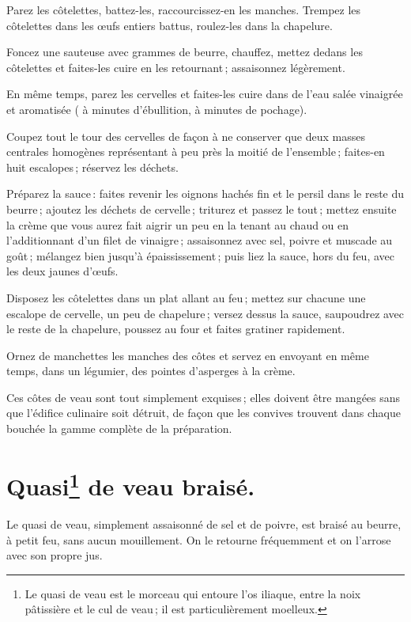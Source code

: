 Parez les côtelettes, battez-les, raccourcissez-en les manches. Trempez les
côtelettes dans les œufs entiers battus, roulez-les dans la chapelure.

Foncez une sauteuse avec {\mmm} grammes de beurre, chauffez, mettez dedans les
côtelettes et faites-les cuire en les retournant ; assaisonnez légèrement.

En même temps, parez les cervelles et faites-les cuire dans de l'eau salée
vinaigrée et aromatisée ({\mmm} à {\mmm} minutes d'ébullition, {\mmm} à {\mmm} minutes de pochage).

Coupez tout le tour des cervelles de façon à ne conserver que deux masses
centrales homogènes représentant à peu près la moitié de l'ensemble ; faites-en
huit escalopes ; réservez les déchets.

Préparez la sauce : faites revenir les oignons hachés fin et le persil dans le
reste du beurre ; ajoutez les déchets de cervelle ; triturez et passez le
tout ; mettez ensuite la crème que vous aurez fait aigrir un peu en la tenant
au chaud ou en l'additionnant d'un filet de vinaigre ; assaisonnez avec sel,
poivre et muscade au goût ; mélangez bien jusqu'à épaississement ; puis liez la
sauce, hors du feu, avec les deux jaunes d'œufs.

Disposez les côtelettes dans un plat allant au feu ; mettez sur chacune une
escalope de cervelle, un peu de chapelure ; versez dessus la sauce, saupoudrez
avec le reste de la chapelure, poussez au four et faites gratiner rapidement.

Ornez de manchettes les manches des côtes et servez en envoyant en même
temps, dans un légumier, des pointes d'asperges à la crème.

Ces côtes de veau sont tout simplement exquises ; elles doivent être mangées
sans que l'édifice culinaire soit détruit, de façon que les convives trouvent
dans chaque bouchée la gamme complète de la préparation.

\section*{\centering Quasi\footnote{Le quasi de veau est le morceau qui entoure
l'os iliaque, entre la noix pâtissière et le cul de veau ; il est
particulièrement moelleux.} de veau braisé.}
{}

Le quasi de veau, simplement assaisonné de sel et de poivre, est braisé au
beurre, à petit feu, sans aucun mouillement. On le retourne fréquemment et on
l'arrose avec son propre jus.

